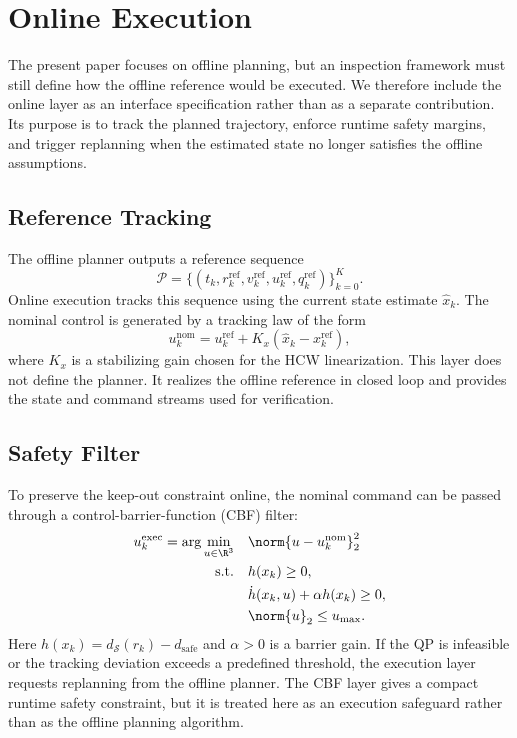\section{Online Execution}
\label{sec:online}

The present paper focuses on offline planning, but an inspection framework
must still define how the offline reference would be executed. We therefore
include the online layer as an interface specification rather than as a
separate contribution. Its purpose is to track the planned trajectory, enforce
runtime safety margins, and trigger replanning when the estimated state no
longer satisfies the offline assumptions.

\subsection{Reference Tracking}

The offline planner outputs a reference sequence
\begin{equation}
  \mathcal{P}=\{(t_k,r_k^{\mathrm{ref}},v_k^{\mathrm{ref}},u_k^{\mathrm{ref}},
  q_k^{\mathrm{ref}})\}_{k=0}^{K}.
\end{equation}
Online execution tracks this sequence using the current state estimate
$\hat{x}_k$. The nominal control is generated by a tracking law of the form
\begin{equation}
  u_k^{\mathrm{nom}} = u_k^{\mathrm{ref}} + K_x(\hat{x}_k - x_k^{\mathrm{ref}}),
\end{equation}
where $K_x$ is a stabilizing gain chosen for the HCW linearization. This layer
does not define the planner. It realizes the offline reference in closed loop
and provides the state and command streams used for verification.

\subsection{Safety Filter}

To preserve the keep-out constraint online, the nominal command can be passed
through a control-barrier-function (CBF) filter:
\begin{align}
  u_k^{\mathrm{exec}} = \arg\min_{u \in \R^3}\quad & \norm{u-u_k^{\mathrm{nom}}}_2^2 \\
  \mathrm{s.t.}\quad &
  h(x_k) \ge 0, \nonumber\\
  & \dot{h}(x_k,u) + \alpha h(x_k) \ge 0, \nonumber\\
  & \norm{u}_2 \le u_{\max}. \nonumber
\end{align}
Here $h(x_k)=d_{\mathcal S}(r_k)-d_{\mathrm{safe}}$ and $\alpha>0$ is a
barrier gain. If the QP is infeasible or the tracking deviation exceeds a
predefined threshold, the execution layer requests replanning from the offline
planner. The CBF layer gives a compact runtime safety constraint, but it is
treated here as an execution safeguard rather than as the offline planning
algorithm.

